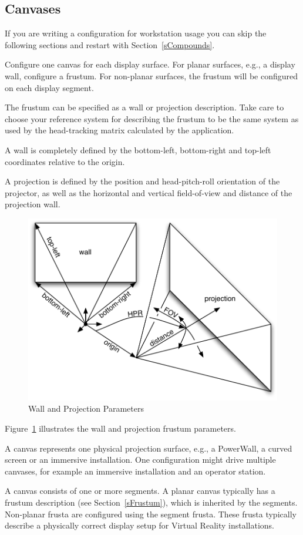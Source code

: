 \documentclass[10pt,a4]{scrartcl}
\newcommand{\fig}[1]{Figure~\ref{#1}}
\newcommand{\sref}[1]{Section~\ref{#1}}
\begin{document}
\subsection{\label{sCanvas}Canvases}

If you are writing a configuration for workstation usage you can skip
the following sections and restart with \sref{sCompounds}.

Configure one \textsf{canvas} for each display surface. For planar
surfaces, e.g., a display wall, configure a frustum. For non-planar
surfaces, the frustum will be configured on each display segment.

The frustum can be specified as a wall or projection description. Take
care to choose your reference system for describing the frustum to be
the same system as used by the head-tracking matrix calculated by the
application.

A wall is completely defined by the bottom-left, bottom-right and
top-left coordinates relative to the origin.

A projection is defined by the position and head-pitch-roll orientation
of the projector, as well as the horizontal and vertical field-of-view
and distance of the projection wall.

\begin{figure}
  \includegraphics[width=.618\textwidth]{images/frusta.pdf}
  {\caption{\label{fFrusta}Wall and Projection Parameters}}
\end{figure}
\fig{fFrusta} illustrates the wall and projection frustum parameters.

A canvas represents one physical projection surface, e.g., a PowerWall, a
curved screen or an immersive installation. One configuration might
drive multiple canvases, for example an immersive installation and an
operator station.

A canvas consists of one or more segments. A planar canvas typically has
a frustum description (see \sref{sFrustum}), which is inherited by the
segments. Non-planar frusta are configured using the segment
frusta. These frusta typically describe a physically correct display
setup for Virtual Reality installations.
\end{document}
